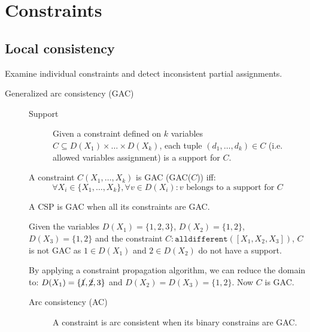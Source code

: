 \section{Constraints}


\subsection{Local consistency}

Examine individual constraints and detect inconsistent partial assignments.

\begin{description}
    \item[Generalized arc consistency (GAC)] 
        \phantom{}
        \begin{description}
            \item[Support]
                Given a constraint defined on $k$ variables $C \subseteq D(X_1)\times \dots \times D(X_k)$,
                each tuple $(d_1, \dots, d_k) \in C$ (i.e. allowed variables assignment) is a support for $C$.
        \end{description}

        A constraint $C(X_1, \dots, X_k)$ is GAC (GAC($C$)) iff:
        \[ \forall X_i \in \{ X_1, \dots, X_k \}, \forall v \in D(X_i): \text{$v$ belongs to a support for $C$} \]

        \begin{remark}
            A CSP is GAC when all its constraints are GAC.
        \end{remark}

        \begin{example}
            Given the variables $D(X_1) = \{ 1, 2, 3 \}$, $D(X_2) = \{ 1, 2 \}$, $D(X_3) = \{ 1, 2 \}$ and 
            the constraint $C: \texttt{alldifferent}([X_1, X_2, X_3])$,
            $C$ is not GAC as $1 \in D(X_1)$ and $2 \in D(X_2)$ do not have a support.
            
            By applying a constraint propagation algorithm, we can reduce the domain to: 
            $D(X_1) = \{ \cancel{1}, \cancel{2}, 3 \}$ and $D(X_2) = D(X_3) = \{ 1, 2 \}$.
            Now $C$ is GAC.
        \end{example}

        \begin{description}
            \item[Arc consistency (AC)] 
                A constraint is arc consistent when its binary constrains are GAC.


\end{description}
\end{description}
